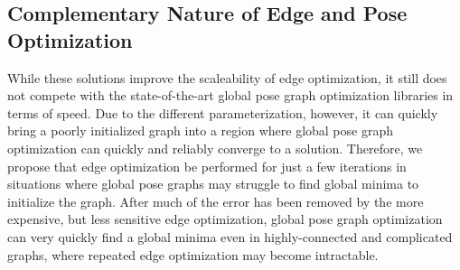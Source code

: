 \subsection{Complementary Nature of Edge and Pose Optimization}
While these solutions improve the scaleability of edge optimization, it still does not compete with the state-of-the-art global pose graph optimization libraries in terms of speed.  Due to the different parameterization, however, it can quickly bring a poorly initialized graph into a region where global pose graph optimization can quickly and reliably converge to a solution.  Therefore, we propose that edge optimization be performed for just a few iterations in situations where global pose graphs may struggle to find global minima to initialize the graph.  After much of the error has been removed by the more expensive, but less sensitive edge optimization, global pose graph optimization can very quickly find a global minima even in highly-connected and complicated graphs, where repeated edge optimization may become intractable.


